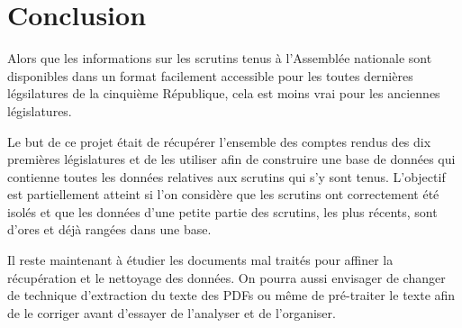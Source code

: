 \section*{Conclusion}

Alors que les informations sur les scrutins tenus à l'Assemblée nationale sont disponibles dans un format facilement accessible pour les toutes dernières légsilatures de la cinquième République, cela est moins vrai pour les anciennes législatures.

Le but de ce projet était de récupérer l'ensemble des comptes rendus des dix premières législatures et de les utiliser afin de construire une base de données qui contienne toutes les données relatives aux scrutins qui s'y sont tenus. L'objectif est partiellement atteint si l'on considère que les scrutins ont correctement été isolés et que les données d'une petite partie des scrutins, les plus récents, sont d'ores et déjà rangées dans une base.

Il reste maintenant à étudier les documents mal traités pour affiner la récupération et le nettoyage des données. On pourra aussi envisager de changer de technique d'extraction du texte des PDFs ou même de pré-traiter le texte afin de le corriger avant d'essayer de l'analyser et de l'organiser.
